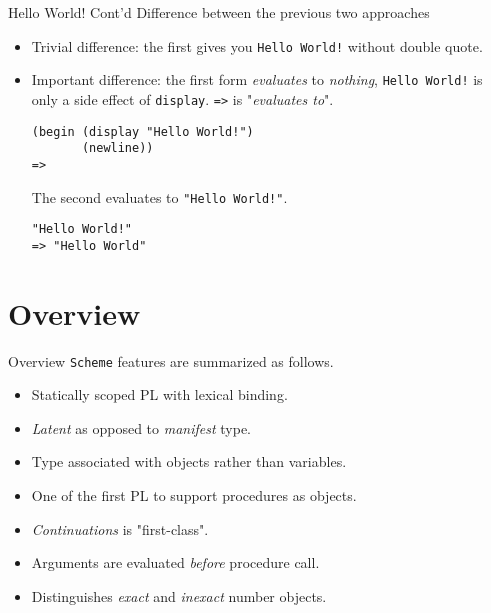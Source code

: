 \documentclass[presentation]{beamer}
\begin{document}
\begin{frame}[fragile,label={sec:orgheadline5}]{Hello World! Cont'd}
 Difference between the previous two approaches

\begin{itemize}
\item Trivial difference: the first gives you \texttt{Hello World!} without
double quote.
\item Important difference: the first form \emph{evaluates} to \emph{nothing},
\texttt{Hello World!} is only a \alert{side effect} of \texttt{display}.  \texttt{=>}
is "\emph{evaluates to}".

\begin{verbatim}
(begin (display "Hello World!")
       (newline))
=>
\end{verbatim}

The second evaluates to \texttt{​"Hello World!"​}.

\begin{verbatim}
"Hello World!"
=> "Hello World"
\end{verbatim}
\end{itemize}
\end{frame}

\section{Overview}
\label{sec:orgheadline10}

\begin{frame}[fragile,label={sec:orgheadline7}]{Overview}
 \texttt{Scheme} features are summarized as follows.

\begin{itemize}
\item Statically scoped PL with lexical binding.
\item \emph{Latent} as opposed to \emph{manifest} type.
\item Type associated with objects rather than variables.
\item One of the first PL to support procedures as objects.
\item \emph{Continuations} is "first-class".
\item Arguments are evaluated \emph{before} procedure call.
\item Distinguishes \emph{exact} and \emph{inexact} number objects.
\end{itemize}
\end{frame}
\end{document}
